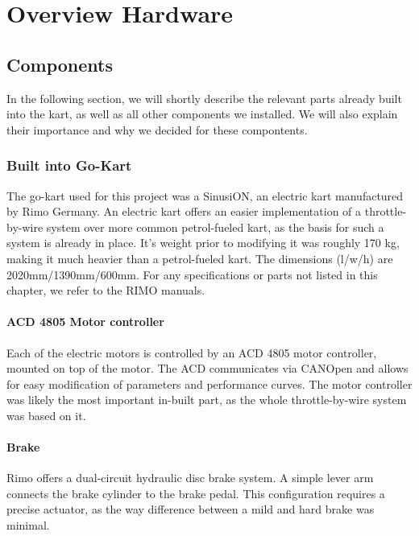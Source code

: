 
\chapter{Overview Hardware}
\label{chp:Hardware}

\section{Components}
In the following section, we will shortly describe the relevant parts already built into the kart, as well as all other components we installed. We will also explain their importance and why we decided for these compontents.

\subsection{Built into Go-Kart}

The go-kart used for this project was a SinusiON, an electric kart manufactured by Rimo Germany. An electric kart offers an easier implementation of a throttle-by-wire system over more common petrol-fueled kart, as the basis for such a system is already in place. 
It's weight prior to modifying it was roughly 170 kg, making it much heavier than a petrol-fueled kart. The dimensions (l/w/h) are 2020mm/1390mm/600mm.
For any specifications or parts not listed in this chapter, we refer to the RIMO manuals.


\subsubsection{ACD 4805 Motor controller}
Each of the electric motors is controlled by an ACD 4805 motor controller, mounted on top of the motor. The ACD communicates via CANOpen and allows for easy modification of parameters and performance curves. The motor controller was likely the most important in-built part, as the whole throttle-by-wire system was based on it.


\subsubsection{Brake}
Rimo offers a dual-circuit hydraulic disc brake system. A simple lever arm connects the brake cylinder to the brake pedal. This configuration requires a precise actuator, as the way difference between a mild and hard brake was minimal. 

